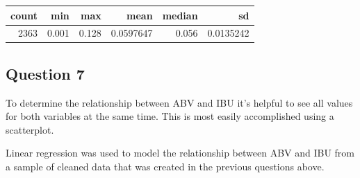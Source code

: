 \documentclass[]{article}
\newenvironment{Shaded}{\begin{snugshade}}{\end{snugshade}}
\newcommand{\KeywordTok}[1]{\textcolor[rgb]{0.13,0.29,0.53}{\textbf{#1}}}
\newcommand{\DataTypeTok}[1]{\textcolor[rgb]{0.13,0.29,0.53}{#1}}
\newcommand{\StringTok}[1]{\textcolor[rgb]{0.31,0.60,0.02}{#1}}
\newcommand{\CommentTok}[1]{\textcolor[rgb]{0.56,0.35,0.01}{\textit{#1}}}
\newcommand{\OperatorTok}[1]{\textcolor[rgb]{0.81,0.36,0.00}{\textbf{#1}}}
\newcommand{\NormalTok}[1]{#1}
\begin{document}
\begin{Shaded}
\end{Shaded}

\begin{longtable}[]{@{}rrrrrr@{}}
\toprule
count & min & max & mean & median & sd\tabularnewline
\midrule
\endhead
2363 & 0.001 & 0.128 & 0.0597647 & 0.056 & 0.0135242\tabularnewline
\bottomrule
\end{longtable}

\subsection{Question 7}\label{question-7}

To determine the relationship between ABV and IBU it's helpful to see
all values for both variables at the same time. This is most easily
accomplished using a scatterplot.

Linear regression was used to model the relationship between ABV and IBU
from a sample of cleaned data that was created in the previous questions
above.
\end{document}
